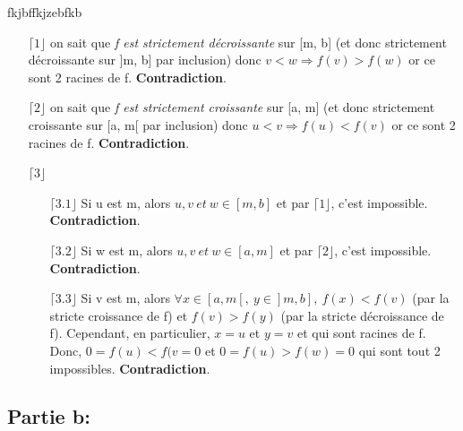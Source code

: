 fkjbffkjzebfkb\documentclass[a4paper, 12pt]{article}
\begin{document}
\begin{enumerate}
	\item[\(\lceil 1 \rfloor\)] on sait que \emph{f est strictement décroissante} sur [m, b] (et donc strictement décroissante sur ]m, b] par inclusion) donc \( v < w \Rightarrow f(v) > f(w) \) or ce sont 2 racines de f. \textbf{Contradiction}.
	\item[\(\lceil 2 \rfloor\)] on sait que \emph{f est strictement croissante} sur [a, m] (et donc strictement croissante sur [a, m[ par inclusion) donc \( u < v \Rightarrow f(u) < f(v) \) or ce sont 2 racines de f. \textbf{Contradiction}.
	\item[\(\lceil 3 \rfloor\)] $~$ \newline
	\begin{enumerate}
		\item[\(\lceil 3.1 \rfloor\)] Si u est m, alors \( u, v ~ et ~ w \in [m, b] \) et par \(\lceil 1 \rfloor\), c'est impossible. \textbf{Contradiction}.
		\item[\(\lceil 3.2 \rfloor\)] Si w est m, alors \( u, v ~ et ~ w \in [a, m] \) et par \(\lceil 2 \rfloor\), c'est impossible. \textbf{Contradiction}.
		\item[\(\lceil 3.3 \rfloor\)] Si v est m, alors \( \forall x \in [a, m[, ~ y \in ]m, b], ~ f(x) < f(v) \) (par la stricte croissance de f) et \( f(v) > f(y)\) (par la stricte décroissance de f). Cependant, en particulier, \( x = u \) et \( y = v \) et qui sont racines de f. Donc, \( 0 = f(u) < f(v = 0 \) et \( 0 = f(u) > f(w) = 0 \) qui sont tout 2 impossibles. \textbf{Contradiction}. 
	\end{enumerate}
\end{enumerate}

\newpage
\subsection{Partie b:}
\end{document}
